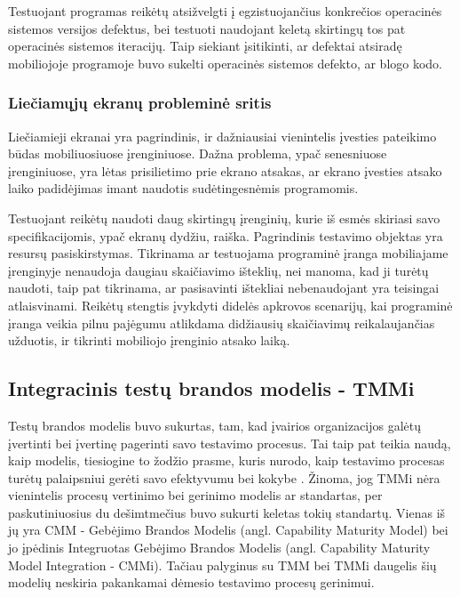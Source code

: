 \documentclass{VUMIFPSkursinis}
\begin{document}
Testuojant programas reikėtų atsižvelgti į egzistuojančius konkrečios operacinės sistemos versijos defektus, bei testuoti naudojant keletą skirtingų tos pat operacinės sistemos iteracijų. Taip siekiant įsitikinti, ar defektai atsiradę mobiliojoje programoje buvo sukelti operacinės sistemos defekto, ar blogo kodo.

\subsubsection{Liečiamųjų ekranų probleminė sritis}
Liečiamieji ekranai yra pagrindinis, ir dažniausiai vienintelis įvesties pateikimo būdas mobiliuosiuose įrenginiuose. Dažna problema, ypač senesniuose įrenginiuose, yra lėtas prisilietimo prie ekrano atsakas, ar ekrano įvesties atsako laiko padidėjimas imant naudotis sudėtingesnėmis programomis.

Testuojant reikėtų naudoti daug skirtingų įrenginių, kurie iš esmės skiriasi savo specifikacijomis, ypač ekranų dydžiu, raiška. Pagrindinis testavimo objektas yra resursų pasiskirstymas. Tikrinama ar testuojama programinė įranga mobiliajame įrenginyje nenaudoja daugiau skaičiavimo išteklių, nei manoma, kad ji turėtų naudoti, taip pat tikrinama, ar pasisavinti ištekliai nebenaudojant yra teisingai atlaisvinami. Reikėtų stengtis įvykdyti didelės apkrovos scenarijų, kai programinė įranga veikia pilnu pajėgumu atlikdama didžiausių skaičiavimų reikalaujančias užduotis, ir tikrinti mobiliojo įrenginio atsako laiką.

\subsection{Integracinis testų brandos modelis - TMMi}
Testų brandos modelis buvo sukurtas, tam, kad įvairios organizacijos galėtų įvertinti bei įvertinę pagerinti savo testavimo procesus. Tai taip pat teikia naudą, kaip modelis, tiesiogine to žodžio prasme, kuris nurodo, kaip testavimo procesas turėtų  palaipsniui gerėti savo efektyvumu bei kokybe \cite{Burnstein:2010:PST:1965566}. Žinoma, jog TMMi nėra vienintelis procesų vertinimo bei gerinimo modelis ar standartas, per paskutiniuosius du dešimtmečius buvo sukurti keletas tokių standartų. Vienas iš jų yra CMM - Gebėjimo Brandos Modelis (angl. Capability Maturity Model) bei jo įpėdinis Integruotas Gebėjimo Brandos Modelis (angl. Capability Maturity Model Integration - CMMi). Tačiau palyginus su TMM bei TMMi daugelis šių modelių neskiria pakankamai dėmesio testavimo procesų gerinimui. 
\end{document}
